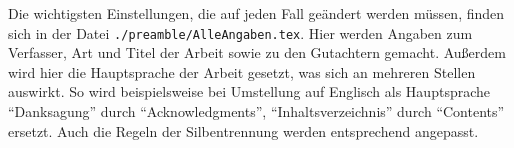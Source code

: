 Die wichtigsten Einstellungen, die auf jeden Fall geändert werden müssen,
finden sich in der Datei \verb+./preamble/AlleAngaben.tex+.
Hier werden \ua Angaben zum Verfasser, Art und Titel der Arbeit sowie zu den Gutachtern gemacht.
Außerdem wird hier die Hauptsprache der Arbeit gesetzt, was sich an mehreren Stellen auswirkt.
So wird beispielsweise bei Umstellung auf Englisch als Hauptsprache
\enquote{Danksagung} durch \enquote{Acknowledgments},
\enquote{Inhaltsverzeichnis} durch \enquote{Contents}
\usw ersetzt.
Auch die Regeln der Silbentrennung werden entsprechend angepasst.